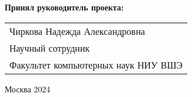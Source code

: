\begin{titlepage}
    \vspace{1em}
    {\bf Принял руководитель проекта: \vspace{2mm}}
    
    {
    \begin{tabular}{l}
    Чиркова Надежда Александровна\\
    Научный сотрудник\\
    Факультет компьютерных наук НИУ ВШЭ 
    \end{tabular}}
    
    
    
    
    
    \vspace{\fill}
    
    \begin{center}
    Москва 2024
    \end{center}
    
    \end{titlepage}